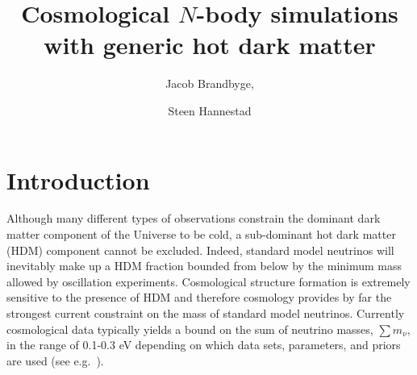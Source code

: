 \documentclass[11pt,a4paper]{article}
\renewcommand\({\left(}
\renewcommand\){\right)}
\renewcommand\[{\left[}
\renewcommand\]{\right]}
\begin{document}


\title{Cosmological $N$-body simulations with generic hot dark matter}

\author[a,b]{Jacob Brandbyge,}
\author[a]{Steen Hannestad}





\maketitle

\section{Introduction}

Although many different types of observations constrain the dominant dark matter component of the Universe to be cold, a sub-dominant hot dark matter (HDM) component cannot be excluded. Indeed, standard model neutrinos will inevitably make up a HDM fraction bounded from below by the minimum mass allowed by oscillation experiments. Cosmological structure formation is extremely sensitive to the presence of HDM and therefore cosmology provides by far the strongest current constraint on the mass of standard model neutrinos. Currently cosmological data typically yields a bound on the sum of neutrino masses, $\sum m_\nu$, in the range of 0.1-0.3 eV depending on which data sets, parameters, and priors are used (see e.g.\ 
\cite{Ade:2015xua,Moresco:2016nqq,Vagnozzi:2017ovm,Giusarma:2016phn,Couchot:2017pvz,Capozzi:2017ipn}).
\end{document}
